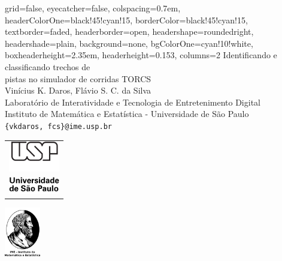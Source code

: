 \documentclass[portrait,a0paper,fontscale=0.292]{baposter}
\begin{document}
\begin{poster}{
    grid=false,
    eyecatcher=false, %
    colspacing=0.7em,
    headerColorOne=black!45!cyan!15,
    borderColor=black!45!cyan!15,
    textborder=faded,
    headerborder=open,
    headershape=roundedright,
    headershade=plain,
    background=none,
    bgColorOne=cyan!10!white,
    boxheaderheight=2.35em,
    headerheight=0.153\textheight,
    columns=2
}
{
}
{
    Identificando e classificando trechos de\\[0.2em]
    pistas no simulador de corridas TORCS
}
{
    \\Vinícius K. Daros, Flávio S. C. da Silva\\[0.5em]
    Laboratório de Interatividade e Tecnologia de Entretenimento Digital
    \\[0.15em]
    Instituto de Matemática e Estatística - Universidade de São Paulo\\[0.5em]
    \texttt{\{vkdaros, fcs\}@ime.usp.br}
}
{
    \parbox[t][5em][b]{7.5em}{
        \begin{tabular}{l}
            \includegraphics[width=6em]{usp-logo}\\
            \includegraphics[width=6em]{universidade}
        \end{tabular}
    }
    \parbox[t][7.2em][b]{4.5em}{
        \includegraphics[height=5.75em]{logo-ime}
    }

}
\end{poster}
\end{document}
